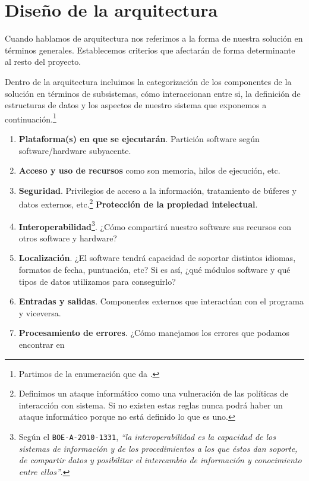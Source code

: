 \section{Diseño de la arquitectura}

Cuando hablamos de arquitectura nos referimos a la forma de nuestra solución en términos generales.
Establecemos criterios que afectarán de forma determinante al resto del proyecto.

Dentro de la arquitectura incluimos la categorización de los componentes de la solución en términos
de subsistemas, cómo interaccionan entre si, la definición de estructuras de datos y los aspectos
de nuestro sistema que exponemos a continuación.\footnote{Partimos de la enumeración que da
\cite[Architecture Prerequisite]{CodeComplete2}.}

\begin{enumerate}
    \item \textbf{Plataforma(s) en que se ejecutarán}. Partición software según software/hardware
          subyacente.
    \item \textbf{Acceso y uso de recursos} como son memoria, hilos de ejecución, etc.
    \item \textbf{Seguridad}. Privilegios de acceso a la información, tratamiento de búferes
          y datos externos, etc.\footnote{
            Definimos un ataque informático como una vulneración de las políticas de
            interacción con sistema. Si no existen estas reglas nunca podrá haber un
            ataque informático porque no está definido lo que es uno.
          } \textbf{Protección de la propiedad intelectual}.
    \item \textbf{Interoperabilidad}\footnote{Según el \texttt{BOE-A-2010-1331}, \textit{``la interoperabilidad
          es la capacidad de los sistemas de información y de los procedimientos a los que éstos dan soporte,
          de compartir datos y posibilitar el intercambio de información y conocimiento entre ellos''}.}. ¿Cómo compartirá nuestro software sus recursos con otros
          software y hardware?
    \item \textbf{Localización}. ¿El software tendrá capacidad de soportar distintos
          idiomas, formatos de fecha, puntuación, etc? Si es así, ¿qué módulos software y qué
          tipos de datos utilizamos para conseguirlo?
    \item \textbf{Entradas y salidas}. Componentes externos que interactúan con el programa y viceversa.
    \item \textbf{Procesamiento de errores}. ¿Cómo manejamos los errores que podamos encontrar en 

\end{enumerate}
